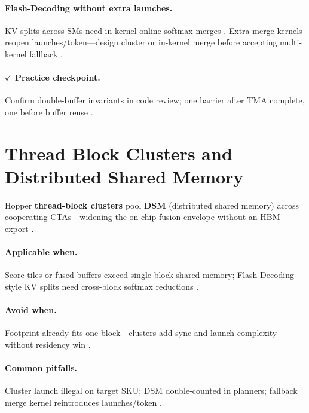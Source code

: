 \paragraph{Flash-Decoding without extra launches.}
KV splits across SMs need in-kernel online softmax merges \citep{dao2023flashdecoding,dao2022flashattention}.
Extra merge kernels reopen launches/token---design cluster or in-kernel merge before accepting multi-kernel fallback \citep{taxbreak2026,nvidia2024cudagraphs,yirage2026}.

\paragraph{$\checkmark$ Practice checkpoint.}
Confirm double-buffer invariants in code review; one barrier after TMA complete, one before buffer reuse \citep{yirage2026,semianalysis2024tma}.

\section{Thread Block Clusters and Distributed Shared Memory}
\label{sec:ch04_cluster_dsm}

Hopper \textbf{thread-block clusters} pool \textbf{DSM} (distributed shared memory) across cooperating CTAs---widening the on-chip fusion envelope without an HBM export \citep{nvidia2022hopper,semianalysis2024tma}.

\paragraph{Applicable when.}
Score tiles or fused buffers exceed single-block shared memory; Flash-Decoding-style KV splits need cross-block softmax reductions \citep{dao2023flashdecoding,dao2022flashattention}.

\paragraph{Avoid when.}
Footprint already fits one block---clusters add sync and launch complexity without residency win \citep{yirage2026}.

\paragraph{Common pitfalls.}
Cluster launch illegal on target SKU; DSM double-counted in planners; fallback merge kernel reintroduces launches/token \citep{taxbreak2026,chen2020compilerbasedhardw}.

